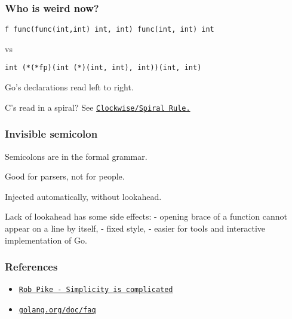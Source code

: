 \documentclass[9pt]{beamer}
\newcommand{\myblue} [1] {{\color{blue}#1}}
\begin{document}
\begin{frame}[fragile]
\frametitle{Who is weird now?}



\begin{verbatim}
f func(func(int,int) int, int) func(int, int) int

\end{verbatim}


vs



\begin{verbatim}
int (*(*fp)(int (*)(int, int), int))(int, int)

\end{verbatim}


Go's declarations read left to right.


C's read in a spiral? See \myblue{\href{http://c-faq.com/decl/spiral.anderson.html}{\texttt{Clockwise/Spiral Rule.}}}



\end{frame}

\begin{frame}[fragile]
\frametitle{Invisible semicolon}


Semicolons are in the formal grammar.


Good for parsers, not for people.


Injected automatically, without lookahead.


Lack of lookahead has some side effects:
	- opening brace of a function cannot appear on a line by itself,
	- fixed style,
	- easier for tools and interactive implementation of Go.



\end{frame}

\begin{frame}[fragile]
\frametitle{References}


\begin{itemize}
\item \myblue{\href{https://www.youtube.com/watch?v=rFejpH\_tAHM}{\texttt{Rob Pike - Simplicity is complicated}}}
\item \myblue{\href{https://golang.org/doc/faq}{\texttt{golang.org/doc/faq}}}
\end{itemize}


\end{frame}
\end{document}
